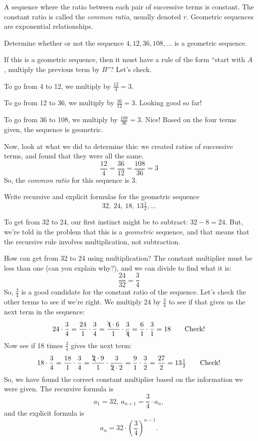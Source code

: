 \begin{boxeddef}
A sequence where the ratio between each pair of successive terms is constant. The constant ratio is called the \textit{common ratio}, usually denoted $r$. Geometric sequences are exponential relationships.
\end{boxeddef}


\begin{boxedex}
Determine whether or not the sequence $4, 12, 36, 108, \dotsc$ is a geometric sequence.

\exsoln{} If this is a geometric sequence, then it must have a rule of the form ``start with $A$, multiply the previous term by $B$''? Let's check.

To go from 4 to 12, we multiply by $\frac{12}{4} = 3$.

To go from 12 to 36, we multiply by $\frac{36}{12} = 3$. Looking good so far!

To go from 36 to 108, we multiply by $\frac{108}{36} = 3$. Nice! Based on the four terms given, the sequence is geometric.

Now, look at what we did to determine this: we created ratios of successive terms, and found that they were all the same. \[\frac{12}{4} = \frac{36}{12} = \frac{108}{36} = 3\] So, the \textit{common ratio} for this sequence is 3.
\end{boxedex}

\begin{boxedex}
Write recursive and explicit formulas for the geometric sequence
\[32,~ 24,~ 18,~ 13\tfrac{1}{2}, \dotsc\]

\exsoln{} To get from 32 to 24, our first instinct might be to subtract: $32 - 8 = 24$. But, we're told in the problem that this is a \textit{geometric} sequence, and that means that the recursive rule involves multiplication, not subtraction.

How can get from 32 to 24 using multiplication? The constant multiplier must be less than one (can you explain why?), and we can divide to find what it is: \[\frac{24}{32} = \frac{3}{4}\]
So, $\frac{3}{4}$ is a good candidate for the constant ratio of the sequence. Let's check the other terms to see if we're right. We multiply 24 by $\frac{3}{4}$ to see if that gives us the next term in the sequence: \[24 \cdot\frac{3}{4} = \frac{24}{1}\cdot\frac{3}{4} = \frac{\bcancel{4} \cdot 6}{1}\cdot\frac{3}{\bcancel{4}} = \frac{6}{1}\cdot\frac{3}{1} = 18 \qquad\text{Check!}\]
Now see if 18 times $\frac{3}{4}$ gives the next term:
\[18 \cdot\frac{3}{4} = \frac{18}{1}\cdot\frac{3}{4} = \frac{\bcancel{2} \cdot 9}{1}\cdot\frac{3}{\bcancel{2} \cdot 2} = \frac{9}{1}\cdot\frac{3}{2} = \frac{27}{2} = 13\tfrac{1}{2} \qquad\text{Check!}\]
So, we have found the correct constant multiplier based on the information we were given. The recursive formula is
\[a_1 = 32, ~ a_{n+1} = \frac{3}{4} \cdot a_n,\] and the explicit formula is
\[a_n = 32 \cdot \left( \frac{3}{4} \right)^{n-1}.\]
\end{boxedex}


